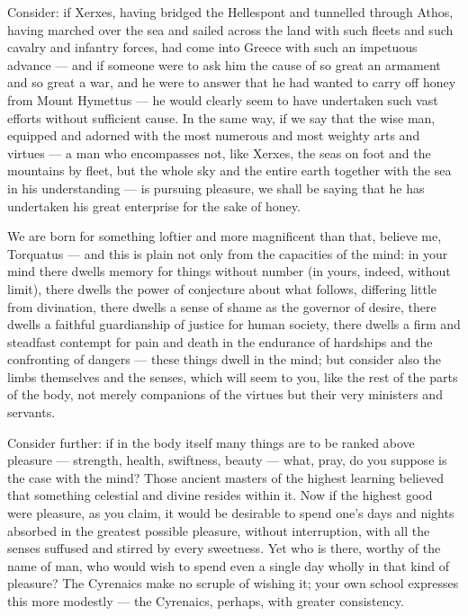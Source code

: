 Consider: if Xerxes, having bridged the Hellespont and tunnelled through Athos, having marched over the sea and sailed across the land with such fleets and such cavalry and infantry forces, had come into Greece with such an impetuous advance — and if someone were to ask him the cause of so great an armament and so great a war, and he were to answer that he had wanted to carry off honey from Mount Hymettus — he would clearly seem to have undertaken such vast efforts without sufficient cause. In the same way, if we say that the wise man, equipped and adorned with the most numerous and most weighty arts and virtues — a man who encompasses not, like Xerxes, the seas on foot and the mountains by fleet, but the whole sky and the entire earth together with the sea in his understanding — is pursuing pleasure, we shall be saying that he has undertaken his great enterprise for the sake of honey.

We are born for something loftier and more magnificent than that, believe me, Torquatus — and this is plain not only from the capacities of the mind: in your mind there dwells memory for things without number (in yours, indeed, without limit), there dwells the power of conjecture about what follows, differing little from divination, there dwells a sense of shame as the governor of desire, there dwells a faithful guardianship of justice for human society, there dwells a firm and steadfast contempt for pain and death in the endurance of hardships and the confronting of dangers — these things dwell in the mind; but consider also the limbs themselves and the senses, which will seem to you, like the rest of the parts of the body, not merely companions of the virtues but their very ministers and servants.

Consider further: if in the body itself many things are to be ranked above pleasure — strength, health, swiftness, beauty — what, pray, do you suppose is the case with the mind? Those ancient masters of the highest learning believed that something celestial and divine resides within it. Now if the highest good were pleasure, as you claim, it would be desirable to spend one's days and nights absorbed in the greatest possible pleasure, without interruption, with all the senses suffused and stirred by every sweetness. Yet who is there, worthy of the name of man, who would wish to spend even a single day wholly in that kind of pleasure? The Cyrenaics make no scruple of wishing it; your own school expresses this more modestly — the Cyrenaics, perhaps, with greater consistency.

